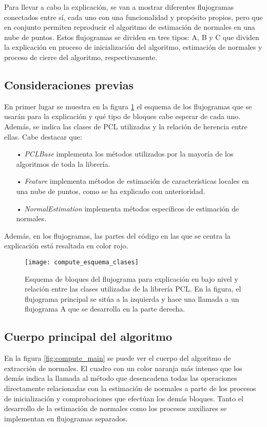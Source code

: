 Para llevar a cabo la explicación, se van a mostrar diferentes flujogramas conectados entre sí, cada uno con una funcionalidad y propósito propios, pero que en conjunto permiten reproducir el algoritmo de estimación de normales en una nube de puntos. Estos flujogramas se dividen en tres tipos: A, B y C que dividen la explicación en proceso de inicialización del algoritmo, estimación de normales y proceso de cierre del algoritmo, respectivamente.

\subsection{Consideraciones previas}
En primer lugar se muestra en la figura \ref{fig:compute_esquema_clases} el esquema de los flujogramas que se usarán para la explicación y qué tipo de bloques cabe esperar de cada uno. Además, se indica las clases de PCL utilizadas y la relación de herencia entre ellas. Cabe destacar que:

\begin{itemize}
\item[•]\textit{PCLBase} implementa los métodos utilizados por la mayoría de los algoritmos de toda la librería.
\item[•]\textit{Feature} implementa métodos de estimación de características locales en una nube de puntos, como se ha explicado con anterioridad.
\item[•]\textit{NormalEstimation} implementa métodos específicos de estimación de normales.
\end{itemize} 

Además, en los flujogramas, las partes del código en las que se centra la explicación está resaltada en color rojo.
\begin{figure}[h!]
\centering
\texttt{[image: compute\_esquema\_clases]}
\caption{Esquema de bloques del flujograma para explicación en bajo nivel y relación entre las clases utilizadas de la librería PCL. En la figura, el flujograma principal se sitúa a la izquierda y hace una llamada a un flujograma A que se desarrolla en la parte derecha.}\label{fig:compute_esquema_clases}
\end{figure}

\subsection{Cuerpo principal del algoritmo}
En la figura \ref{fig:compute_main} se puede ver el cuerpo del algoritmo de extracción de normales. El cuadro con un color naranja más intenso que los demás indica la llamada al método que desencadena todas las operaciones directamente relacionadas con la estimación de normales a parte de los procesos de inicialización y comprobaciones que efectúan los demás bloques. Tanto el desarrollo de la estimación de normales como los procesos auxiliares se implementan en flujogramas separados.

